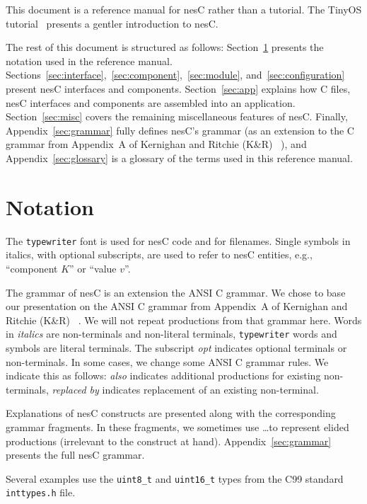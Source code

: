 \documentclass[11pt]{article}
\newcommand{\kw}[1]{{\tt #1}}
\newcommand{\code}[1]{{\tt #1}}
\newcommand{\file}[1]{{\tt #1}}
\newcommand{\nesc}{nesC\xspace}
\begin{document}
This document is a reference manual for \nesc rather than a tutorial. The
TinyOS tutorial~\cite{tinyos-tutorial} presents a gentler introduction
to \nesc.

The rest of this document is structured as follows:
Section~\ref{sec:notation} presents the notation used in the reference
manual. Sections~\ref{sec:interface},~\ref{sec:component},~\ref{sec:module},
and~\ref{sec:configuration} present \nesc interfaces and
components. Section~\ref{sec:app} explains how C files, \nesc interfaces
and components are assembled into an application. Section~\ref{sec:misc}
covers the remaining miscellaneous features of \nesc. Finally,
Appendix~\ref{sec:grammar} fully defines \nesc's grammar (as an extension to
the C grammar from Appendix~A of Kernighan and Ritchie (K\&R)
~\cite[pp234--239]{kandr}), and Appendix~\ref{sec:glossary} is a glossary
of the terms used in this reference manual.

\section{Notation}
\label{sec:notation}

The \texttt{typewriter} font is used for \nesc code and for
filenames. Single symbols in italics, with optional subscripts, are used to
refer to \nesc entities, e.g., ``component $K$'' or ``value $v$''.

The grammar of \nesc is an extension the ANSI C grammar. We chose to base
our presentation on the ANSI C grammar from Appendix~A of Kernighan and
Ritchie (K\&R) ~\cite[pp234--239]{kandr}. We will not repeat productions
from that grammar here. Words in \emph{italics} are non-terminals and
non-literal terminals, \kw{typewriter} words and symbols are literal
terminals. The subscript \emph{opt} indicates optional terminals or
non-terminals. In some cases, we change some ANSI C grammar rules. We
indicate this as follows: \emph{also} indicates additional productions for
existing non-terminals, \emph{replaced by} indicates replacement of an
existing non-terminal. 

Explanations of \nesc constructs are presented along with the corresponding
grammar fragments. In these fragments, we sometimes use \ldots to represent
elided productions (irrelevant to the construct at
hand). Appendix~\ref{sec:grammar} presents the full \nesc grammar.

Several examples use the \code{uint8\_t} and \code{uint16\_t} types from
the C99 standard \file{inttypes.h} file.
\end{document}
